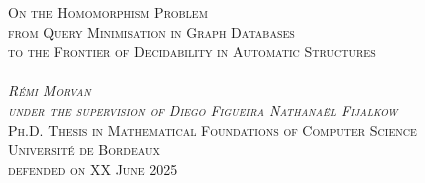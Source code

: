 \begin{titlepage}
\begin{center}
  \Huge\scshape{%
  On the Homomorphism Problem}\\[.5cm]
  \Large\scshape{%
  from Query Minimisation in Graph Databases\\[.2cm]to the Frontier of Decidability in Automatic Structures}\\
  \vspace{5cm}
  \\
  \vfill
  \normalfont%
  \huge{}\emph{Rémi Morvan}\\
  \large\emph{under the supervision of 
  Diego Figueira {\color{maincolor}\fancyand} Nathanaël Fijalkow}\\[1cm]
  \normalfont\Large\scshape
  Ph.D. Thesis in Mathematical Foundations of Computer Science\\
  \textcolor{maincolor}{Université de Bordeaux}\\
  defended on XX June 2025
\end{center}
\end{titlepage}
\restoregeometry